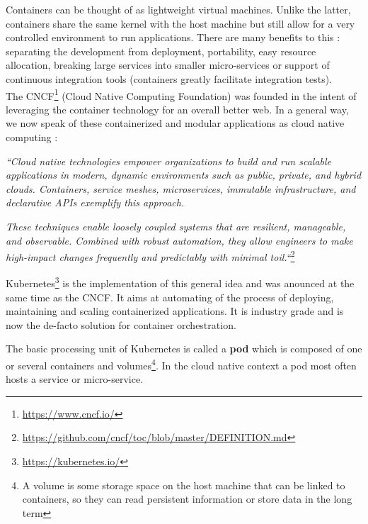 \documentclass[12pt, a4paper]{memoir}
\begin{document}
Containers can be thought of as lightweight virtual machines. Unlike the
latter, containers share the same kernel with the host machine but still allow
for a very controlled environment to run applications. There are many
benefits to this : separating the development from deployment, portability,
easy resource allocation, breaking large services into smaller micro-services
or support of continuous integration tools (containers greatly facilitate
integration tests).\\

The CNCF\footnote{\url{https://www.cncf.io/}} (Cloud Native Computing
Foundation) was founded in the intent of leveraging the container technology
for an overall better web. In a general way, we now speak of these
containerized and modular applications as cloud native computing :

\textit{``Cloud native technologies empower organizations to build and run
	scalable applications in modern, dynamic environments such as public,
	private, and hybrid clouds. Containers, service meshes, microservices,
	immutable infrastructure, and declarative APIs exemplify this
	approach.}

\textit{These techniques enable loosely coupled systems that
	are resilient, manageable, and observable.  Combined with robust
	automation, they allow engineers to make high-impact changes frequently
	and predictably with minimal toil.``}\footnote{\url{https://github.com/cncf/toc/blob/master/DEFINITION.md}}

Kubernetes\footnote{\url{https://kubernetes.io/}} is the implementation of this
general idea and was anounced at the same time as the CNCF. It aims at
automating of the process of deploying, maintaining and scaling containerized
applications. It is industry grade and is now the de-facto solution for
container orchestration.

The basic processing unit of Kubernetes is called a \textbf{pod} which is
composed of one or several containers and volumes\footnote{A volume is some
	storage space on the host machine that can be linked to containers, so
	they can read persistent information or store data in the long term}.
In the cloud native context a pod most often hosts a service or micro-service.
\end{document}
